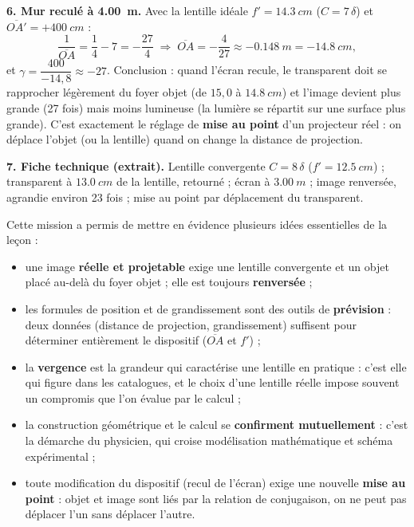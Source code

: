 \documentclass[11pt]{article}
\newcounter{popsec}
\newcounter{popsub}
\newcommand{\courssub}[1]{%
  \stepcounter{popsub}%
  \par\vspace{9pt}\noindent{\popxbold\fontsize{11.5}{13}\selectfont\color{popink}{\color{poporange}\thepopsec.\thepopsub}\hspace{6pt}#1}\par\nopagebreak\vspace{4pt}
}
\begin{document}
\begin{exoresolu}
\textbf{6. Mur reculé à \SI{4,00}{m}.} Avec la lentille idéale $f' = \SI{14,3}{cm}$ ($C = 7\,\delta$) et $\overline{OA'} = +\SI{400}{cm}$ :
\[ \frac{1}{\overline{OA}} = \frac{1}{4} - 7 = -\frac{27}{4} \;\Rightarrow\; \overline{OA} = -\frac{4}{27} \approx \SI{-0,148}{m} = \SI{-14,8}{cm}, \]
et $\gamma = \dfrac{400}{-14,8} \approx -27$. Conclusion : quand l'écran recule, le transparent doit se rapprocher légèrement du foyer objet (de $15,0$ à $\SI{14,8}{cm}$) et l'image devient plus grande (27 fois) mais moins lumineuse (la lumière se répartit sur une surface plus grande). C'est exactement le réglage de \textbf{mise au point} d'un projecteur réel : on déplace l'objet (ou la lentille) quand on change la distance de projection.

\textbf{7. Fiche technique (extrait).} Lentille convergente $C = 8\,\delta$ ($f' = \SI{12,5}{cm}$) ; transparent à $\SI{13,0}{cm}$ de la lentille, retourné ; écran à $\SI{3,00}{m}$ ; image renversée, agrandie environ 23 fois ; mise au point par déplacement du transparent.
\end{exoresolu}

\courssub{Bilan de l'activité}

Cette mission a permis de mettre en évidence plusieurs idées essentielles de la leçon :

\begin{itemize}
\item une image \textbf{réelle et projetable} exige une lentille convergente et un objet placé au-delà du foyer objet ; elle est toujours \textbf{renversée} ;
\item les formules de position et de grandissement sont des outils de \textbf{prévision} : deux données (distance de projection, grandissement) suffisent pour déterminer entièrement le dispositif ($\overline{OA}$ et $f'$) ;
\item la \textbf{vergence} est la grandeur qui caractérise une lentille en pratique : c'est elle qui figure dans les catalogues, et le choix d'une lentille réelle impose souvent un compromis que l'on évalue par le calcul ;
\item la construction géométrique et le calcul se \textbf{confirment mutuellement} : c'est la démarche du physicien, qui croise modélisation mathématique et schéma expérimental ;
\item toute modification du dispositif (recul de l'écran) exige une nouvelle \textbf{mise au point} : objet et image sont liés par la relation de conjugaison, on ne peut pas déplacer l'un sans déplacer l'autre.
\end{itemize}
\end{document}
